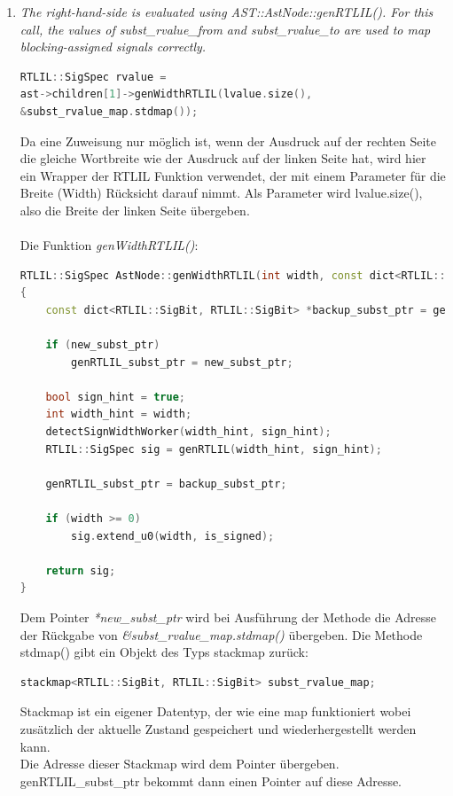 \documentclass[11pt]{report}
\begin{document}
\begin{enumerate}
  \item \textit{The right-hand-side is evaluated using AST::AstNode::genRTLIL(). For this call, the values of subst\_rvalue\_from and subst\_rvalue\_to are used to map blocking-assigned signals correctly.}
\begin{lstlisting}[language=C++]
RTLIL::SigSpec rvalue = 
ast->children[1]->genWidthRTLIL(lvalue.size(), 
&subst_rvalue_map.stdmap());
\end{lstlisting}   
Da eine Zuweisung nur möglich ist, wenn der Ausdruck auf der rechten Seite die gleiche Wortbreite wie der Ausdruck auf der linken Seite hat, wird hier ein Wrapper der RTLIL Funktion verwendet, der mit einem Parameter für die Breite (Width) Rücksicht darauf nimmt. Als Parameter wird lvalue.size(), also die Breite der linken Seite übergeben.\\
\\
Die Funktion \textit{genWidthRTLIL()}:
\begin{lstlisting}[language=C++]
RTLIL::SigSpec AstNode::genWidthRTLIL(int width, const dict<RTLIL::SigBit, RTLIL::SigBit> *new_subst_ptr)
{
	const dict<RTLIL::SigBit, RTLIL::SigBit> *backup_subst_ptr = genRTLIL_subst_ptr;

	if (new_subst_ptr)
		genRTLIL_subst_ptr = new_subst_ptr;

	bool sign_hint = true;
	int width_hint = width;
	detectSignWidthWorker(width_hint, sign_hint);
	RTLIL::SigSpec sig = genRTLIL(width_hint, sign_hint);

	genRTLIL_subst_ptr = backup_subst_ptr;

	if (width >= 0)
		sig.extend_u0(width, is_signed);

	return sig;
}
\end{lstlisting}
Dem Pointer \textit{*new\_subst\_ptr} wird bei Ausführung der Methode die Adresse der Rückgabe von \textit{\&subst\_rvalue\_map.stdmap()} übergeben. Die Methode stdmap() gibt ein Objekt des Typs stackmap zurück:
\begin{lstlisting}[language=C++]
stackmap<RTLIL::SigBit, RTLIL::SigBit> subst_rvalue_map;
\end{lstlisting}

Stackmap ist ein eigener Datentyp, der wie eine map funktioniert wobei zusätzlich der aktuelle Zustand gespeichert und wiederhergestellt werden kann.\\
Die Adresse dieser Stackmap wird dem Pointer übergeben.
genRTLIL\_subst\_ptr bekommt dann einen Pointer auf diese Adresse.


\end{enumerate}
\end{document}
